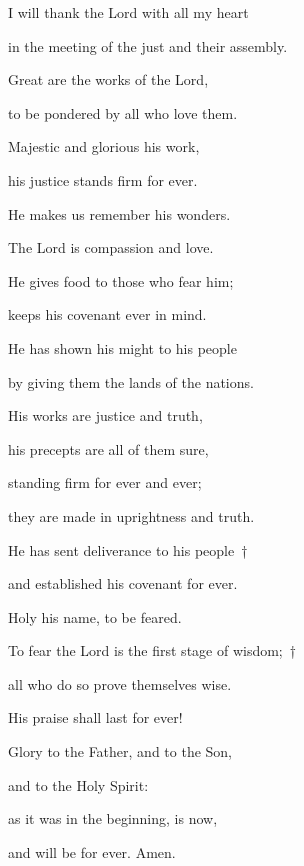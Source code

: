 \noindent I will thank the Lord with all my heart ~\GreStar{}~\nopagebreak

in the meeting of the just and their assembly.

\noindent Great are the works of the Lord, ~\GreStar{}~\nopagebreak

to be pondered by all who love them.



\noindent Majestic and glorious his work, ~\GreStar{}~\nopagebreak

his justice stands firm for ever.

\noindent He makes us remember his wonders. ~\GreStar{}~\nopagebreak

The Lord is compassion and love.



\noindent He gives food to those who fear him; ~\GreStar{}~\nopagebreak

keeps his covenant ever in mind.

\noindent He has shown his might to his people ~\GreStar{}~\nopagebreak

by giving them the lands of the nations.



\noindent His works are justice and truth, ~\GreStar{}~\nopagebreak

his precepts are all of them sure,

\noindent standing firm for ever and ever; ~\GreStar{}~\nopagebreak

they are made in uprightness and truth.



\noindent He has sent deliverance to his people~†~\nopagebreak

and established his covenant for ever. ~\GreStar{}~\nopagebreak

Holy his name, to be feared.



\noindent To fear the Lord is the first stage of wisdom;~†~\nopagebreak

all who do so prove themselves wise. ~\GreStar{}~\nopagebreak

His praise shall last for ever!



\noindent Glory to the Father, and to the Son,~\GreStar{}~\nopagebreak

and to the Holy Spirit:

\noindent as it was in the beginning, is now,~\GreStar{}~\nopagebreak

and will be for ever. Amen.
